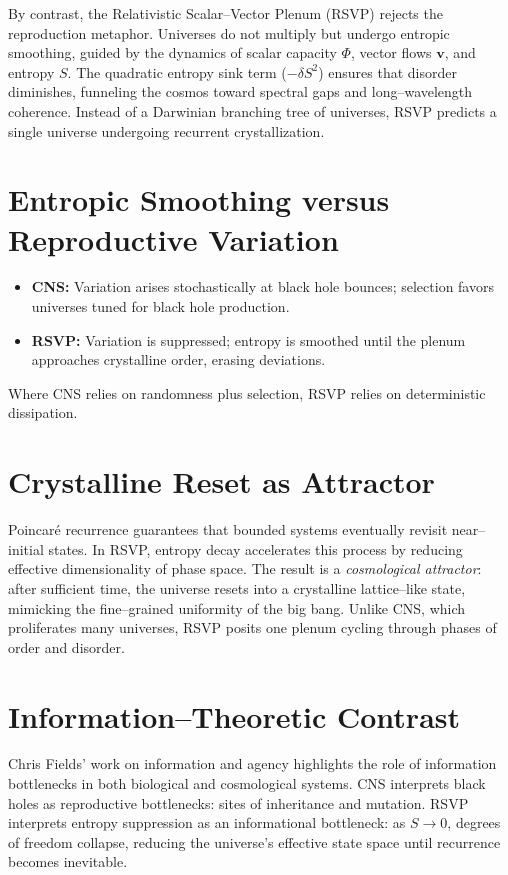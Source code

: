 \documentclass[a4paper,11pt,openany]{book}
\begin{document}
By contrast, the Relativistic Scalar–Vector Plenum (RSVP) rejects the reproduction metaphor. 
Universes do not multiply but undergo entropic smoothing, guided by the dynamics of scalar 
capacity $\Phi$, vector flows $\mathbf{v}$, and entropy $S$. The quadratic entropy sink term 
($-\delta S^2$) ensures that disorder diminishes, funneling the cosmos toward spectral gaps 
and long–wavelength coherence. Instead of a Darwinian branching tree of universes, RSVP 
predicts a single universe undergoing recurrent crystallization.

\section{Entropic Smoothing versus Reproductive Variation}

\begin{itemize}
  \item \textbf{CNS:} Variation arises stochastically at black hole bounces; selection 
  favors universes tuned for black hole production.
  \item \textbf{RSVP:} Variation is suppressed; entropy is smoothed until the plenum 
  approaches crystalline order, erasing deviations.
\end{itemize}

Where CNS relies on randomness plus selection, RSVP relies on deterministic dissipation.

\section{Crystalline Reset as Attractor}

Poincaré recurrence guarantees that bounded systems eventually revisit near–initial states. 
In RSVP, entropy decay accelerates this process by reducing effective dimensionality of 
phase space. The result is a \emph{cosmological attractor}: after sufficient time, the 
universe resets into a crystalline lattice–like state, mimicking the fine–grained uniformity 
of the big bang. Unlike CNS, which proliferates many universes, RSVP posits one plenum 
cycling through phases of order and disorder.

\section{Information–Theoretic Contrast}

Chris Fields’ work on information and agency \citep{fields2021info} highlights the role of 
information bottlenecks in both biological and cosmological systems. CNS interprets black 
holes as reproductive bottlenecks: sites of inheritance and mutation. RSVP interprets 
entropy suppression as an informational bottleneck: as $S\to 0$, degrees of freedom collapse, 
reducing the universe’s effective state space until recurrence becomes inevitable.
\end{document}
